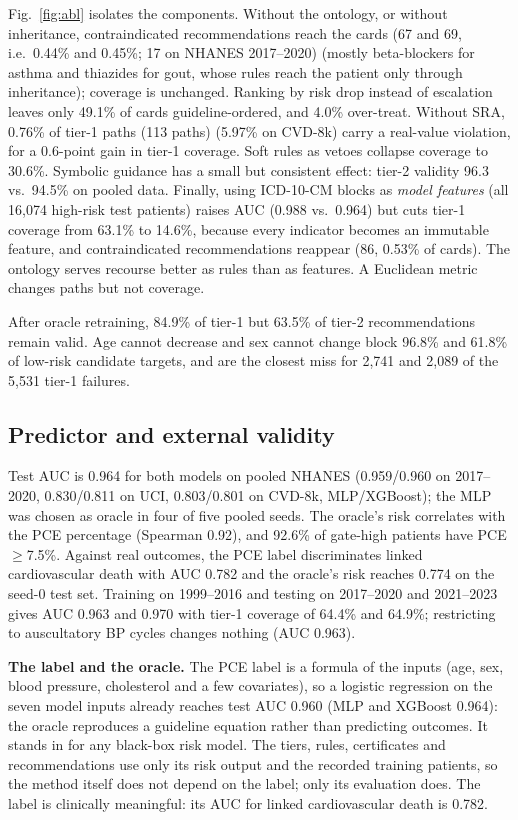 \documentclass[conference]{IEEEtran}
\begin{document}
Fig.~\ref{fig:abl} isolates the components. Without the ontology, or without inheritance, contraindicated recommendations reach the cards (67 and 69, i.e.\ 0.44\% and 0.45\%; 17 on NHANES 2017--2020) (mostly beta-blockers for asthma and thiazides for gout, whose rules reach the patient only through inheritance); coverage is unchanged.  Ranking by risk drop instead of escalation leaves only 49.1\% of cards guideline-ordered, and 4.0\% over-treat. Without SRA, 0.76\% of tier-1 paths (113 paths) (5.97\% on CVD-8k) carry a real-value violation, for a 0.6-point gain in tier-1 coverage. Soft rules as vetoes collapse coverage to 30.6\%. Symbolic guidance has a small but consistent effect: tier-2 validity 96.3 vs.\ 94.5\% on pooled data. Finally, using ICD-10-CM blocks as \emph{model features} (all 16,074 high-risk test patients) raises AUC (0.988 vs.\ 0.964) but cuts tier-1 coverage from 63.1\% to 14.6\%, because every indicator becomes an immutable feature, and contraindicated recommendations reappear (86, 0.53\% of cards). The ontology serves recourse better as rules than as features. A Euclidean metric changes paths but not coverage.

After oracle retraining, 84.9\% of tier-1 but 63.5\% of tier-2 recommendations remain valid. Age cannot decrease and sex cannot change block 96.8\% and 61.8\% of low-risk candidate targets, and are the closest miss for 2,741 and 2,089 of the 5,531 tier-1 failures.

\subsection{Predictor and external validity}
Test AUC is 0.964 for both models on pooled NHANES (0.959/0.960 on 2017--2020, 0.830/0.811 on UCI, 0.803/0.801 on CVD-8k, MLP/XGBoost); the MLP was chosen as oracle in four of five pooled seeds. The oracle's risk correlates with the PCE percentage (Spearman 0.92), and 92.6\% of gate-high patients have PCE $\ge$7.5\%. Against real outcomes, the PCE label discriminates linked cardiovascular death with AUC 0.782 and the oracle's risk reaches 0.774 on the seed-0 test set. Training on 1999--2016 and testing on 2017--2020 and 2021--2023 gives AUC 0.963 and 0.970 with tier-1 coverage of 64.4\% and 64.9\%; restricting to auscultatory BP cycles changes nothing (AUC 0.963). %

\textbf{The label and the oracle.} The PCE label is a formula of the inputs (age, sex, blood pressure, cholesterol and a few covariates), so a logistic regression on the seven model inputs already reaches test AUC 0.960 (MLP and XGBoost 0.964): the oracle reproduces a guideline equation rather than predicting outcomes. It stands in for any black-box risk model. The tiers, rules, certificates and recommendations use only its risk output and the recorded training patients, so the method itself does not depend on the label; only its evaluation does. The label is clinically meaningful: its AUC for linked cardiovascular death is 0.782.
\end{document}
